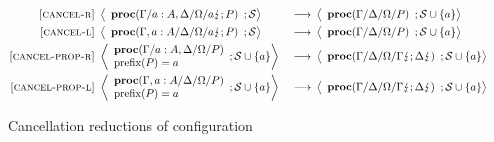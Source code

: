 \documentclass[12pt, openany]{memoir}
\newcommand*{\cancel}[1]{#1 \lightning}
\newcommand*{\procObj}[4]{\textbf{proc}(#1/#2/#3/#4)}
\newcommand*{\cancelSet}[0]{\mathcal{S}}
\begin{document}
\begin{figure}[H]
  \begin{alignat}{4}
    \label{cancelR} \textsc{[cancel-r]} & ~ 
    \Braket{
      \begin{array}{l}
        \procObj{\Gamma}{a : A, \Delta}{\Omega}{\cancel{a}; P}
      \end{array}
      ; \cancelSet
    } & ~ \longrightarrow & ~ 
    \Braket{
      \begin{array}{l}
        \procObj{\Gamma}{\Delta}{\Omega}{P}
      \end{array}
      ; \cancelSet \cup \{a\}
    } \tag*{} \\
    \label{cancelL} \textsc{[cancel-l]} & ~ 
    \Braket{
      \begin{array}{l}
        \procObj{\Gamma, a : A}{\Delta}{\Omega}{\cancel{a}; P}
      \end{array}
      ; \cancelSet
    } & ~ \longrightarrow & ~ 
    \Braket{
      \begin{array}{l}
        \procObj{\Gamma}{\Delta}{\Omega}{P}
      \end{array}
      ; \cancelSet \cup \{a\}
    } \tag*{} \\
    \label{cancel-prop-r} \textsc{[cancel-prop-r]} & ~ 
    \Braket{
      \begin{array}{l}
        \procObj{\Gamma}{a : A, \Delta}{\Omega}{P}\\
        \text{prefix}(P) = a
      \end{array}
      ; \cancelSet \cup \{a\}
    } & ~ \longrightarrow & ~ 
    \Braket{
      \begin{array}{l}
        \procObj{\Gamma}{\Delta}{\Omega}{\cancel{\Gamma}; \cancel{\Delta}} \\
      \end{array}
      ; \cancelSet \cup \{a\}
    } \tag*{} \\
    \label{cancel-prop-l} \textsc{[cancel-prop-l]} & ~ 
    \Braket{
      \begin{array}{l}
        \procObj{\Gamma, a : A}{\Delta}{\Omega}{P} \\
        \text{prefix}(P) = a
      \end{array}
      ; \cancelSet \cup \{a\}
    } & ~ \longrightarrow & ~ 
    \Braket{
      \begin{array}{l}
        \procObj{\Gamma}{\Delta}{\Omega}{\cancel{\Gamma}; \cancel{\Delta}}
      \end{array}
      ; \cancelSet \cup \{a\}
    } \tag*{}
  \end{alignat}
  \raggedleft
  \caption{Cancellation reductions of configuration}
  \label{fig:cancelreduction}
\end{figure}
\end{document}
